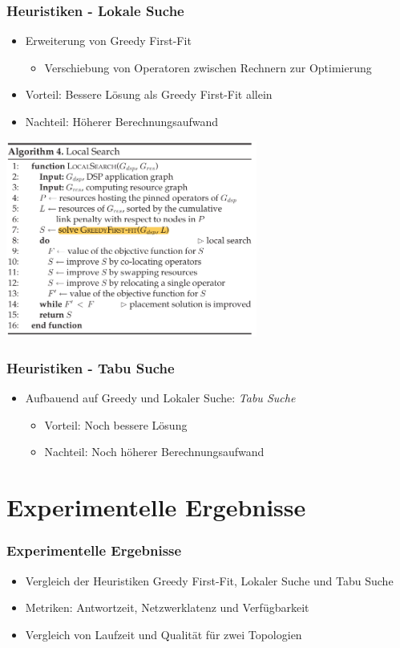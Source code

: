 \documentclass{beamer}
\begin{document}
\begin{frame}
\frametitle{Heuristiken - Lokale Suche}
\begin{itemize}
    \item Erweiterung von Greedy First-Fit
    \begin{itemize}
        \item Verschiebung von Operatoren zwischen Rechnern zur Optimierung
    \end{itemize}
    \item Vorteil: Bessere Lösung als Greedy First-Fit allein
    \item Nachteil: Höherer Berechnungsaufwand
\end{itemize}
    \begin{center}
        \includegraphics[width=0.62\textwidth]{res/algorithmus-lokale-suche.png}
    \end{center}

\end{frame}

\begin{frame}
\frametitle{Heuristiken - Tabu Suche}
\begin{itemize}
    \item Aufbauend auf Greedy und Lokaler Suche: \textit{Tabu Suche}
    \begin{itemize}
        \item Vorteil: Noch bessere Lösung
        \item Nachteil: Noch höherer Berechnungsaufwand
    \end{itemize}
\end{itemize}
\end{frame}

\section{Experimentelle Ergebnisse}
\begin{frame}
\frametitle{Experimentelle Ergebnisse}
\begin{itemize}
    \item Vergleich der Heuristiken Greedy First-Fit, Lokaler Suche und Tabu Suche
    \item Metriken: Antwortzeit, Netzwerklatenz und Verfügbarkeit
    \item Vergleich von Laufzeit und Qualität für zwei Topologien
\end{itemize}
\vspace{0.3cm}
\end{frame}
\end{document}
